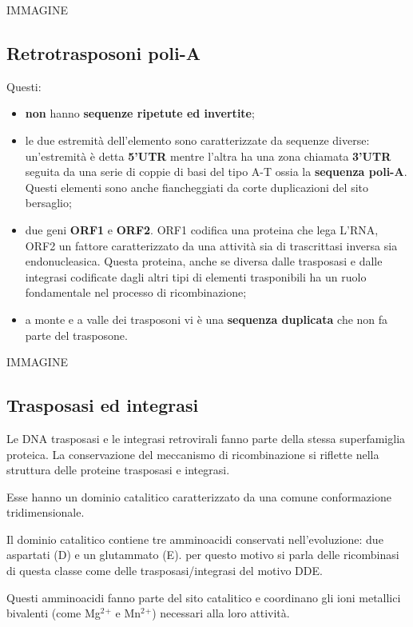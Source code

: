 \documentclass[]{article}
\begin{document}
IMMAGINE

\subsection{Retrotrasposoni poli-A}\label{retrotrasposoni-poli-a}

Questi:

\begin{itemize}
\itemsep1pt\parskip0pt
\item
  \textbf{non} hanno \textbf{sequenze ripetute ed invertite};
\item
  le due estremità dell'elemento sono caratterizzate da sequenze
  diverse: un'estremità è detta \textbf{5'UTR} mentre l'altra ha una
  zona chiamata \textbf{3'UTR} seguita da una serie di coppie di basi
  del tipo A-T ossia la \textbf{sequenza poli-A}. Questi elementi sono
  anche fiancheggiati da corte duplicazioni del sito bersaglio;
\item
  due geni \textbf{ORF1} e \textbf{ORF2}. ORF1 codifica una proteina che
  lega L'RNA, ORF2 un fattore caratterizzato da una attività sia di
  trascrittasi inversa sia endonucleasica. Questa proteina, anche se
  diversa dalle trasposasi e dalle integrasi codificate dagli altri tipi
  di elementi trasponibili ha un ruolo fondamentale nel processo di
  ricombinazione;
\item
  a monte e a valle dei trasposoni vi è una \textbf{sequenza duplicata}
  che non fa parte del trasposone.
\end{itemize}

IMMAGINE

\subsection{Trasposasi ed integrasi}\label{trasposasi-ed-integrasi}

Le DNA trasposasi e le integrasi retrovirali fanno parte della stessa
superfamiglia proteica. La conservazione del meccanismo di
ricombinazione si riflette nella struttura delle proteine trasposasi e
integrasi.

Esse hanno un dominio catalitico caratterizzato da una comune
conformazione tridimensionale.

Il dominio catalitico contiene tre amminoacidi conservati
nell'evoluzione: due aspartati (D) e un glutammato (E). per questo
motivo si parla delle ricombinasi di questa classe come delle
trasposasi/integrasi del motivo DDE.

Questi amminoacidi fanno parte del sito catalitico e coordinano gli ioni
metallici bivalenti (come Mg\(^2\)\(^+\) e Mn\(^2\)\(^+\)) necessari
alla loro attività.
\end{document}
